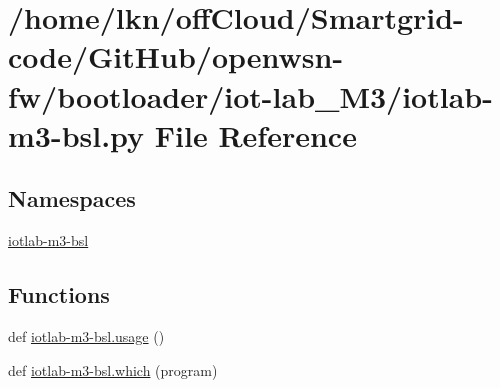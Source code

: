 \hypertarget{iotlab-m3-bsl_8py}{}\section{/home/lkn/off\+Cloud/\+Smartgrid-\/code/\+Git\+Hub/openwsn-\/fw/bootloader/iot-\/lab\+\_\+\+M3/iotlab-\/m3-\/bsl.py File Reference}
\label{iotlab-m3-bsl_8py}
\subsection*{Namespaces}
\begin{DoxyCompactItemize}
\item 
 \hyperlink{namespaceiotlab-m3-bsl}{iotlab-\/m3-\/bsl}
\end{DoxyCompactItemize}
\subsection*{Functions}
\begin{DoxyCompactItemize}
\item 
def \hyperlink{namespaceiotlab-m3-bsl_ac40b90bc19b123467961b89c6af5c503}{iotlab-\/m3-\/bsl.\+usage} ()
\item 
def \hyperlink{namespaceiotlab-m3-bsl_ad8620aaf1b6b0e24a00128cd84915de4}{iotlab-\/m3-\/bsl.\+which} (program)
\end{DoxyCompactItemize}

